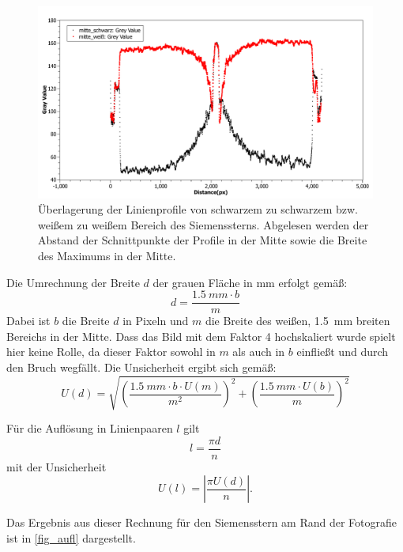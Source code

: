 \documentclass[
	a4paper,
	12pt,
	pagesize,
	ngerman
]{scrartcl}
\begin{document}
	\begin{figure}[H]  
		\includegraphics[width=1\textwidth]{fig_Einzellinse_Linienprofil}%
		\centering
		\caption{
			Überlagerung der Linienprofile von schwarzem zu schwarzem bzw. weißem zu weißem Bereich des Siemenssterns.
			Abgelesen werden der Abstand der Schnittpunkte der Profile in der Mitte sowie die Breite des Maximums in der Mitte.
		}
		\label{fig_einzel_linie}
		\centering
	\end{figure}
	
	Die Umrechnung der Breite $d$ der grauen Fläche in \si{mm} erfolgt gemäß:
	\begin{equation}
		d = \frac{\SI{1,5}{mm} \cdot b}{m}
	\end{equation}
	Dabei ist $b$ die Breite $d$ in Pixeln und $m$ die Breite des weißen, \SI{1,5}{mm} breiten Bereichs in der Mitte.
	Dass das Bild mit dem Faktor 4 hochskaliert wurde spielt hier keine Rolle, da dieser Faktor sowohl in $m$ als auch in $b$ einfließt und durch den Bruch wegfällt.
	Die Unsicherheit ergibt sich gemäß:
	\begin{equation}
		U(d)=\sqrt{\left(\frac{\SI{1,5}{mm} \cdot b \cdot U(m)}{m^2}\right)^2+\left(\frac{\SI{1,5}{mm} \cdot U(b)}{m}\right)^2}
	\end{equation}
	
	Für die Auflösung in Linienpaaren $l$ gilt
	\begin{equation}
		l=\frac{\pi d}{n}
	\end{equation}
	mit der Unsicherheit
	\begin{equation}
		U(l)=\left|\frac{\pi U(d)}{n}\right|. %
	\end{equation}
	
	Das Ergebnis aus dieser Rechnung für den Siemensstern am Rand der Fotografie ist in \cref{fig_aufl} dargestellt.
	
\end{document}
